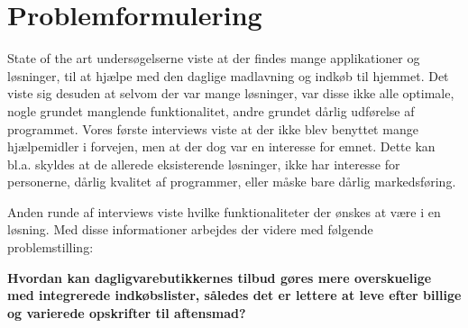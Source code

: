 \section{Problemformulering}\label{section:problemformulering}

State of the art undersøgelserne viste at der findes mange applikationer og løsninger, til at hjælpe med den daglige madlavning og indkøb til hjemmet.
Det viste sig desuden at selvom der var mange løsninger, var disse ikke alle optimale, nogle grundet manglende funktionalitet, andre grundet dårlig udførelse af programmet.
Vores første interviews viste at der ikke blev benyttet mange hjælpemidler i forvejen, men at der dog var en interesse for emnet.
Dette kan bl.a. skyldes at de allerede eksisterende løsninger, ikke har interesse for personerne, dårlig kvalitet af programmer, eller måske bare dårlig markedsføring. 

Anden runde af interviews viste hvilke funktionaliteter der ønskes at være i en løsning.
Med disse informationer arbejdes der videre med følgende problemstilling:

\textbf{Hvordan kan dagligvarebutikkernes tilbud gøres mere overskuelige med integrerede indkøbslister, således det er lettere at leve efter billige og varierede opskrifter til aftensmad?}

